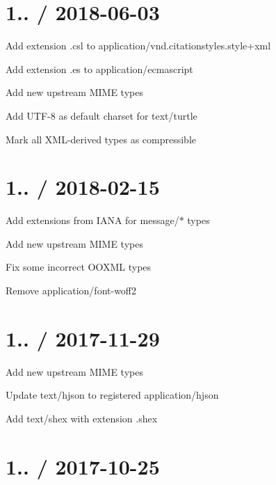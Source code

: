 \section*{1.. / 2018-\/06-\/03 }


\begin{DoxyItemize}
\item Add extension {\ttfamily .csl} to {\ttfamily application/vnd.\+citationstyles.\+style+xml}
\item Add extension {\ttfamily .es} to {\ttfamily application/ecmascript}
\item Add new upstream M\+I\+ME types
\item Add {\ttfamily U\+T\+F-\/8} as default charset for {\ttfamily text/turtle}
\item Mark all X\+M\+L-\/derived types as compressible
\end{DoxyItemize}

\section*{1.. / 2018-\/02-\/15 }


\begin{DoxyItemize}
\item Add extensions from I\+A\+NA for {\ttfamily message/$\ast$} types
\item Add new upstream M\+I\+ME types
\item Fix some incorrect O\+O\+X\+ML types
\item Remove {\ttfamily application/font-\/woff2}
\end{DoxyItemize}

\section*{1.. / 2017-\/11-\/29 }


\begin{DoxyItemize}
\item Add new upstream M\+I\+ME types
\item Update {\ttfamily text/hjson} to registered {\ttfamily application/hjson}
\item Add {\ttfamily text/shex} with extension {\ttfamily .shex}
\end{DoxyItemize}

\section*{1.. / 2017-\/10-\/25 }


